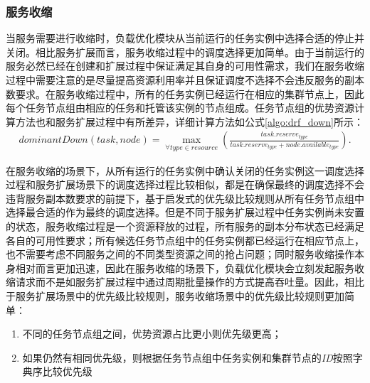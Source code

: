 \subsubsection{服务收缩}\label{sec:scalein}
当服务需要进行收缩时，负载优化模块从当前运行的任务实例中选择合适的停止并关闭。相比服务扩展而言，服务收缩过程中的调度选择更加简单。由于当前运行的服务必然已经在创建和扩展过程中保证满足其自身的可用性需求，我们在服务收缩过程中需要注意的是尽量提高资源利用率并且保证调度不选择不会违反服务的副本数要求。在服务收缩过程中，所有的任务实例已经运行在相应的集群节点上，因此每个任务节点组由相应的任务和托管该实例的节点组成。任务节点组的优势资源计算方法也和服务扩展过程中有所差异，详细计算方法如公式\ref{algo:drf_down}所示：
\begin{equation}\label{algo:drf_down}
\begin{split}
dominantDown({task}, {node}) = \max_{\forall type \in resource} {(\frac{task.reserve_{type}}{task.reserve_{type} + node.available_{type}})}.
\end{split}
\end{equation}

在服务收缩的场景下，从所有运行的任务实例中确认关闭的任务实例这一调度选择过程和服务扩展场景下的调度选择过程比较相似，都是在确保最终的调度选择不会违背服务副本数要求的前提下，基于启发式的优先级比较规则从所有任务节点组中选择最合适的作为最终的调度选择。但是不同于服务扩展过程中任务实例尚未安置的状态，服务收缩过程是一个资源释放的过程，所有服务的副本分布状态已经满足各自的可用性要求；所有候选任务节点组中的任务实例都已经运行在相应节点上，也不需要考虑不同服务之间的不同类型资源之间的抢占问题；同时服务收缩操作本身相对而言更加迅速，因此在服务收缩的场景下，负载优化模块会立刻发起服务收缩请求而不是如服务扩展过程中通过周期批量操作的方式提高吞吐量。因此，相比于服务扩展场景中的优先级比较规则，服务收缩场景中的优先级比较规则更加简单：
\begin{enumerate}
\item 不同的任务节点组之间，优势资源占比更小则优先级更高；
\item 如果仍然有相同优先级，则根据任务节点组中任务实例和集群节点的\emph{ID}按照字典序比较优先级
\end{enumerate}


